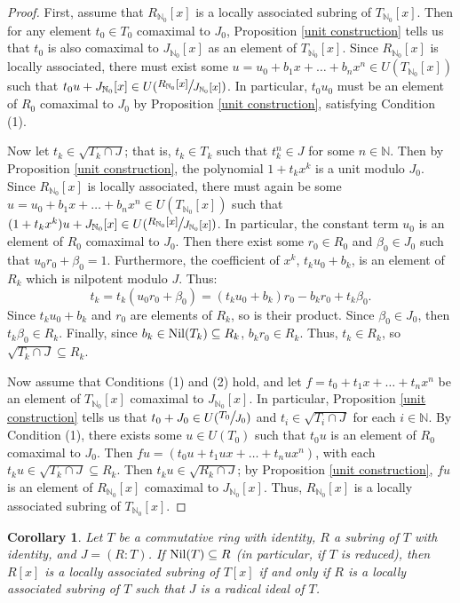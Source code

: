 \documentclass[12pt]{amsart}
\newtheorem{corollary}[theorem]{Corollary}
\theoremstyle{definition}
\newcommand{\bN}{\mathbb N}
\newcommand{\bNo}{{{\mathbb N}_0}}
\newcommand{\quot}[2]{\large\sfrac{#1}{#2}\normalsize}
\newcommand{\Nil}{\textup{Nil}}
\begin{document}
\begin{proof}
    First, assume that $R_\bNo[x]$ is a locally associated subring of $T_\bNo[x]$. Then for any element $t_0\in T_0$ comaximal to $J_0$, Proposition \ref{unit construction} tells us that $t_0$ is also comaximal to $J_\bNo[x]$ as an element of $T_\bNo[x]$. Since $R_\bNo[x]$ is locally associated, there must exist some $u=u_0+b_1x+\dots+b_nx^n\in U(T_\bNo[x])$ such that $t_0u+J_\bNo[x]\in U(\quot{R_\bNo[x]}{J_\bNo[x]})$. In particular, $t_0u_0$ must be an element of $R_0$ comaximal to $J_0$ by Proposition \ref{unit construction}, satisfying Condition (1).

    Now let $t_k\in \sqrt{T_k\cap J}$; that is, $t_k\in T_k$ such that $t_k^n\in J$ for some $n\in\bN$. Then by Proposition \ref{unit construction}, the polynomial $1+t_kx^k$ is a unit modulo $J_0$. Since $R_\bNo[x]$ is locally associated, there must again be some $u=u_0+b_1x+\dots+b_nx^n\in U(T_\bNo[x])$ such that $(1+t_kx^k)u+J_\bNo[x]\in U(\quot{R_\bNo[x]}{J_\bNo[x]})$. In particular, the constant term $u_0$ is an element of $R_0$ comaximal to $J_0$. Then there exist some $r_0\in R_0$ and $\beta_0\in J_0$ such that $u_0r_0+\beta_0=1$. Furthermore, the coefficient of $x^k$, $t_ku_0+b_k$, is an element of $R_k$ which is nilpotent modulo $J$. Thus:
    $$t_k=t_k(u_0r_0+\beta_0)=(t_ku_0+b_k)r_0-b_kr_0+t_k\beta_0.$$
    Since $t_ku_0+b_k$ and $r_0$ are elements of $R_k$, so is their product. Since $\beta_0\in J_0$, then $t_k\beta_0\in R_k$. Finally, since $b_k\in \Nil(T_k)\subseteq R_k$, $b_kr_0\in R_k$. Thus, $t_k\in R_k$, so $\sqrt{T_k\cap J}\subseteq R_k$.

    Now assume that Conditions (1) and (2) hold, and let $f=t_0+t_1x+\dots+t_nx^n$ be an element of $T_\bNo[x]$ comaximal to $J_\bNo[x]$. In particular, Proposition \ref{unit construction} tells us that $t_0+J_0\in U(\quot{T_0}{J_0})$ and $t_i\in \sqrt{T_i\cap J}$ for each $i\in\bN$. By Condition (1), there exists some $u\in U(T_0)$ such that $t_0u$ is an element of $R_0$ comaximal to $J_0$. Then $fu=(t_0u+t_1ux+\dots+t_nux^n)$, with each $t_ku\in \sqrt{T_k\cap J}\subseteq R_k$. Then $t_ku\in \sqrt{R_k\cap J}$; by Proposition \ref{unit construction}, $fu$ is an element of $R_\bNo[x]$ comaximal to $J_\bNo[x]$. Thus, $R_\bNo[x]$ is a locally associated subring of $T_\bNo[x]$.
\end{proof}

\begin{corollary}
    Let $T$ be a commutative ring with identity, $R$ a subring of $T$ with identity, and $J=(R:T)$. If $\Nil(T)\subseteq R$ (in particular, if $T$ is reduced), then $R[x]$ is a locally associated subring of $T[x]$ if and only if $R$ is a locally associated subring of $T$ such that $J$ is a radical ideal of $T$.
\end{corollary}
\end{document}
